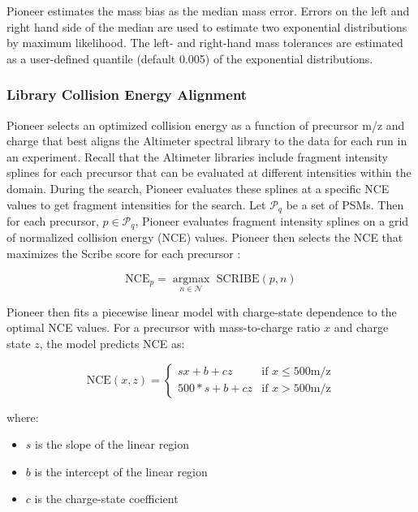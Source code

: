 \documentclass[pdflatex,sn-nature]{sn-jnl}
\begin{document}
Pioneer estimates the mass bias as the median mass error. Errors on the left and right hand side of the median are used to estimate two exponential distributions by maximum likelihood. The left- and right-hand mass tolerances are estimated as a user-defined quantile (default 0.005) of the exponential distributions. 


\subsubsection{Library Collision Energy Alignment}\label{subsubsec:library-collision-energy-alignment}

Pioneer selects an optimized collision energy as a function of precursor m/z and charge that best aligns the Altimeter spectral library to the data for each run in an experiment. Recall that the Altimeter libraries include fragment intensity splines for each precursor that can be evaluated at different intensities within the domain. During the search, Pioneer evaluates these splines at a specific NCE values to get fragment intensities for the search. Let $\mathcal{P}_q$ be a set of PSMs. Then for each precursor, $p \in \mathcal{P}_q$, Pioneer evaluates fragment intensity splines on a grid of normalized collision energy (NCE) values. Pioneer then selects the NCE that maximizes the Scribe score for each precursor \cite{Searle2023-po}:

\begin{equation}
    \text{NCE}_p = \underset{n \in \mathcal{N}}{\operatorname{argmax}} \text{ SCRIBE}(p, n)
\end{equation}

Pioneer then fits a piecewise linear model with charge-state dependence to the optimal NCE values. For a precursor with mass-to-charge ratio $x$ and charge state $z$, the model predicts NCE as:

\begin{equation}
    \text{NCE}(x,z) = \begin{cases}
        sx + b + cz & \text{if } x \leq 500 \text{m/z}\\
        500*s + b + cz & \text{if } x > 500 \text{m/z}
    \end{cases}
\end{equation}

where:
\begin{itemize}
    \item $s$ is the slope of the linear region
    \item $b$ is the intercept of the linear region
    \item $c$ is the charge-state coefficient
\end{itemize}
\end{document}
